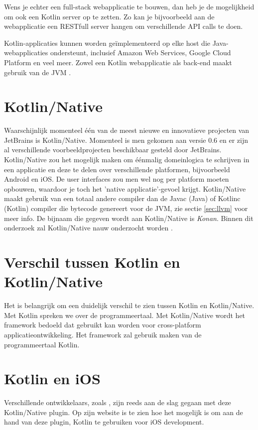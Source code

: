 Wens je echter een full-stack webapplicatie te bouwen, dan heb je de mogelijkheid om ook een Kotlin server op te zetten. Zo kan je bijvoorbeeld aan de webapplicatie een RESTfull server hangen om verschillende API calls te doen.

Kotlin-applicaties kunnen worden geïmplementeerd op elke host die Java-webapplicaties ondersteunt, inclusief Amazon Web Services, Google Cloud Platform en veel meer. Zowel een Kotlin webapplicatie als back-end maakt gebruik van de JVM \autocite{JetBrainsServer}.

\section{Kotlin/Native}
\label{sec:kotlinnative}
Waarschijnlijk momenteel één van de meest nieuwe en innovatieve projecten van JetBrains is Kotlin/Native. Momenteel is men gekomen aan versie 0.6 en er zijn al verschillende voorbeeldprojecten beschikbaar gesteld door JetBrains. Kotlin/Native zou het mogelijk maken om éénmalig domeinlogica te schrijven in een applicatie en deze te delen over verschillende platformen, bijvoorbeeld Android en iOS. De user interfaces zou men wel nog per platform moeten opbouwen, waardoor je toch het 'native applicatie'-gevoel krijgt. Kotlin/Native maakt gebruik van een totaal andere compiler dan de Javac (Java) of Kotlinc (Kotlin) compiler die bytecode genereert voor de JVM, zie sectie \ref{sec:llvm} voor meer info. De bijnaam die gegeven wordt aan Kotlin/Native is \textit{Konan}. Binnen dit onderzoek zal Kotlin/Native nauw onderzocht worden \autocite{AlbertGao}.

\section{Verschil tussen Kotlin en Kotlin/Native}
\label{sec:differenceKotlinAndNative}
Het is belangrijk om een duidelijk verschil te zien tussen Kotlin en Kotlin/Native. Met Kotlin spreken we over de programmeertaal. Met Kotlin/Native wordt het framework bedoeld dat gebruikt kan worden voor cross-platform applicatieontwikkeling. Het framework zal gebruik maken van de programmeertaal Kotlin.

\section{Kotlin en iOS}
Verschillende ontwikkelaars, zoals \textcite{GaoIOS}, zijn reeds aan de slag gegaan met deze Kotlin/Native plugin. Op zijn website is te zien hoe het mogelijk is om aan de hand van deze plugin, Kotlin te gebruiken voor iOS development. 

